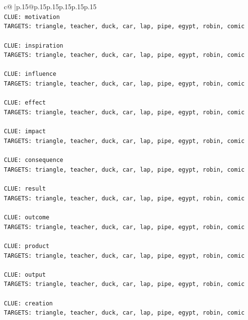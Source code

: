 \documentclass{article}
\begin{document}
{\begin{supertabular}{c@{$\;$}|p{.15\linewidth}@{}p{.15\linewidth}p{.15\linewidth}p{.15\linewidth}p{.15\linewidth}p{.15\linewidth}}
{{{\\ 
\texttt{CLUE: motivation} \\
\texttt{TARGETS: triangle, teacher, duck, car, lap, pipe, egypt, robin, comic} \\
\\ 
\texttt{CLUE: inspiration} \\
\texttt{TARGETS: triangle, teacher, duck, car, lap, pipe, egypt, robin, comic} \\
\\ 
\texttt{CLUE: influence} \\
\texttt{TARGETS: triangle, teacher, duck, car, lap, pipe, egypt, robin, comic} \\
\\ 
\texttt{CLUE: effect} \\
\texttt{TARGETS: triangle, teacher, duck, car, lap, pipe, egypt, robin, comic} \\
\\ 
\texttt{CLUE: impact} \\
\texttt{TARGETS: triangle, teacher, duck, car, lap, pipe, egypt, robin, comic} \\
\\ 
\texttt{CLUE: consequence} \\
\texttt{TARGETS: triangle, teacher, duck, car, lap, pipe, egypt, robin, comic} \\
\\ 
\texttt{CLUE: result} \\
\texttt{TARGETS: triangle, teacher, duck, car, lap, pipe, egypt, robin, comic} \\
\\ 
\texttt{CLUE: outcome} \\
\texttt{TARGETS: triangle, teacher, duck, car, lap, pipe, egypt, robin, comic} \\
\\ 
\texttt{CLUE: product} \\
\texttt{TARGETS: triangle, teacher, duck, car, lap, pipe, egypt, robin, comic} \\
\\ 
\texttt{CLUE: output} \\
\texttt{TARGETS: triangle, teacher, duck, car, lap, pipe, egypt, robin, comic} \\
\\ 
\texttt{CLUE: creation} \\
\texttt{TARGETS: triangle, teacher, duck, car, lap, pipe, egypt, robin, comic} \\
\\ 
}}}
\end{supertabular}}
\end{document}
